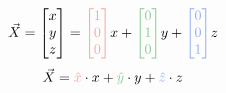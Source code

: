 \documentclass[preview]{standalone}
\begin{document}
$$\vec{X} = \begin{bmatrix}x\\y\\z\end{bmatrix} = \textcolor[HTML]{f9a598}{\begin{bmatrix}1\\0\\0\end{bmatrix}} x + \textcolor[HTML]{87c993}{\begin{bmatrix}0\\1\\0\end{bmatrix}} y + \textcolor[HTML]{94acef}{\begin{bmatrix}0\\0\\1\end{bmatrix}} z$$
$$\vec{X} = \textcolor[HTML]{f9a598}{\hat{x}}\cdot x + \textcolor[HTML]{87c993}{\hat{y}}\cdot y + \textcolor[HTML]{94acef}{\hat{z}}\cdot z$$
\end{document}
